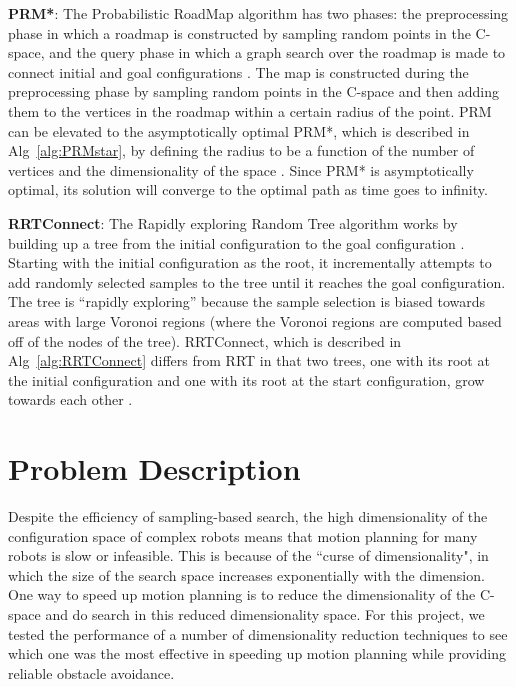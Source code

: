\documentclass[12pt]{article}
\begin{document}
\textbf{PRM*}: The Probabilistic RoadMap algorithm has two phases: the preprocessing phase in which a roadmap is constructed by sampling random points in the C-space, and the query phase in which a graph search over the roadmap is made to connect initial and goal configurations \cite{kavraki1996prm}. The map is constructed during the preprocessing phase by sampling random points in the C-space and then adding them to the vertices in the roadmap within a certain radius of the point. PRM can be elevated to the asymptotically optimal PRM*, which is described in Alg~\ref{alg:PRMstar}, by defining the radius to be a function of the number of vertices and the dimensionality of the space \cite{karaman2011sampling}. Since PRM* is asymptotically optimal, its solution will converge to the optimal path as time goes to infinity.

\textbf{RRTConnect}: The Rapidly exploring Random Tree algorithm works by building up a tree from the initial configuration to the goal configuration \cite{lavalle1998rrt}. Starting with the initial configuration as the root, it incrementally attempts to add randomly selected samples to the tree until it reaches the goal configuration. The tree is ``rapidly exploring'' because the sample selection is biased towards areas with large Voronoi regions (where the Voronoi regions are computed based off of the nodes of the tree). RRTConnect, which is described in Alg~\ref{alg:RRTConnect} differs from RRT in that two trees, one with its root at the initial configuration and one with its root at the start configuration, grow towards each other \cite{kuffner2000rrt}.

\section{Problem Description}

Despite the efficiency of sampling-based search, the high dimensionality of the
configuration space of complex robots means that motion planning for many
robots is slow or infeasible. This is because of the ``curse of dimensionality",
in which the size of the search space increases exponentially with the
dimension. One way to speed up motion planning is to reduce the dimensionality
of the C-space and do search in this reduced dimensionality space. For this
project, we tested the performance of a number of dimensionality reduction
techniques to see which one was the most effective in speeding up motion
planning while providing reliable obstacle avoidance.
\end{document}
